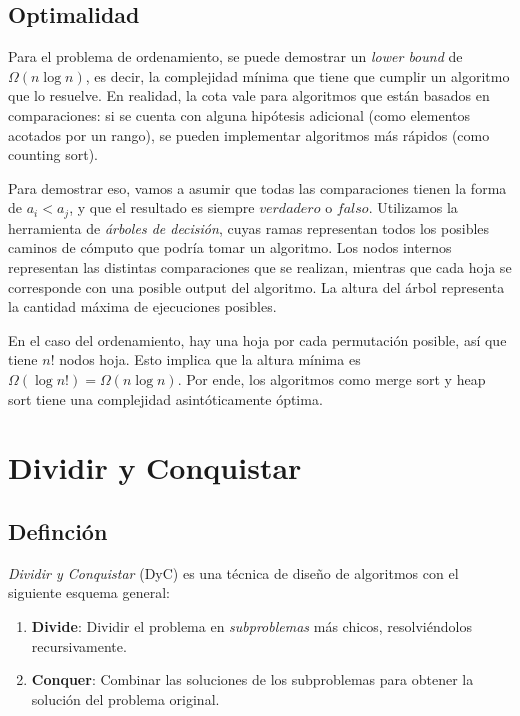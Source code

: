 \documentclass{article}
\newcommand{\BigOmega}[1]{{\Omega(#1)}}
\begin{document}
\subsection{Optimalidad}

Para el problema de ordenamiento, se puede demostrar un \textit{lower bound} de $\BigOmega{n\log{n}}$, es decir, la complejidad mínima que tiene que cumplir un algoritmo que lo resuelve. En realidad, la cota vale para algoritmos que están basados en comparaciones: si se cuenta con alguna hipótesis adicional (como elementos acotados por un rango), se pueden implementar algoritmos más rápidos (como counting sort).

Para demostrar eso, vamos a asumir que todas las comparaciones tienen la forma de $a_i < a_j$, y que el resultado es siempre $verdadero$ o $falso$. Utilizamos la herramienta de \textit{árboles de decisión}, cuyas ramas representan todos los posibles caminos de cómputo que podría tomar un algoritmo. Los nodos internos representan las distintas comparaciones que se realizan, mientras que cada hoja se corresponde con una posible output del algoritmo. La altura del árbol representa la cantidad máxima de ejecuciones posibles.

En el caso del ordenamiento, hay una hoja por cada permutación posible, así que tiene $n!$ nodos hoja. Esto implica que la altura mínima es $\BigOmega{\log{n!}} = \BigOmega{n\log{n}}$. Por ende, los algoritmos como merge sort y heap sort tiene una complejidad asintóticamente óptima.

\section{Dividir y Conquistar}
\label{sec-dyc}

\subsection{Definción}

\textit{Dividir y Conquistar} (DyC) es una técnica de diseño de algoritmos con el siguiente esquema general:
\begin{enumerate}
    \item \textbf{Divide}: Dividir el problema en \textit{subproblemas} más chicos, resolviéndolos recursivamente.
    \item \textbf{Conquer}: Combinar las soluciones de los subproblemas para obtener la solución del problema original.
\end{enumerate}
\end{document}
